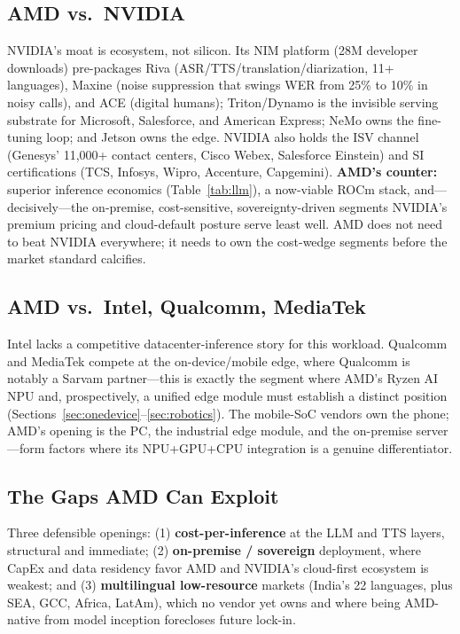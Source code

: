 \documentclass[blind]{gtac}
\begin{document}
\subsection{AMD vs.\ NVIDIA}
NVIDIA's moat is ecosystem, not silicon. Its NIM platform (28M developer downloads) pre-packages Riva (ASR/TTS/translation/diarization, 11+ languages), Maxine (noise suppression that swings WER from 25\% to 10\% in noisy calls), and ACE (digital humans); Triton/Dynamo is the invisible serving substrate for Microsoft, Salesforce, and American Express; NeMo owns the fine-tuning loop; and Jetson owns the edge. NVIDIA also holds the ISV channel (Genesys' 11{,}000+ contact centers, Cisco Webex, Salesforce Einstein) and SI certifications (TCS, Infosys, Wipro, Accenture, Capgemini). \textbf{AMD's counter:} superior inference economics (Table~\ref{tab:llm}), a now-viable ROCm stack, and---decisively---the on-premise, cost-sensitive, sovereignty-driven segments NVIDIA's premium pricing and cloud-default posture serve least well. AMD does not need to beat NVIDIA everywhere; it needs to own the cost-wedge segments before the market standard calcifies.

\subsection{AMD vs.\ Intel, Qualcomm, MediaTek}
Intel lacks a competitive datacenter-inference story for this workload. Qualcomm and MediaTek compete at the on-device/mobile edge, where Qualcomm is notably a Sarvam partner---this is exactly the segment where AMD's Ryzen AI NPU and, prospectively, a unified edge module must establish a distinct position (Sections~\ref{sec:onedevice}--\ref{sec:robotics}). The mobile-SoC vendors own the phone; AMD's opening is the PC, the industrial edge module, and the on-premise server---form factors where its NPU+GPU+CPU integration is a genuine differentiator.

\subsection{The Gaps AMD Can Exploit}
Three defensible openings: (1) \textbf{cost-per-inference} at the LLM and TTS layers, structural and immediate; (2) \textbf{on-premise / sovereign} deployment, where CapEx and data residency favor AMD and NVIDIA's cloud-first ecosystem is weakest; and (3) \textbf{multilingual low-resource} markets (India's 22 languages, plus SEA, GCC, Africa, LatAm), which no vendor yet owns and where being AMD-native from model inception forecloses future lock-in.
\end{document}
